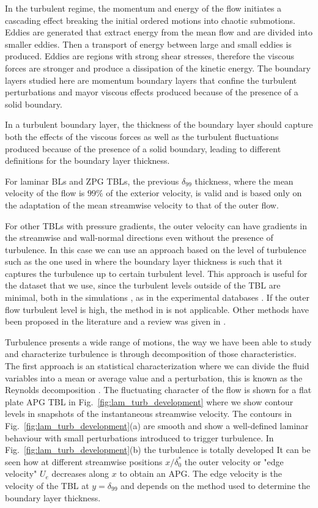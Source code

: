 In the turbulent regime, the momentum and energy of the flow initiates a cascading effect breaking the initial ordered motions into chaotic submotions. 
Eddies are generated that extract energy from the mean flow and are divided into smaller eddies. Then a transport of energy between large and small eddies is produced. Eddies are regions with strong shear stresses, therefore the viscous forces are stronger and produce a dissipation of the kinetic energy.
The boundary layers studied here are momentum boundary layers that confine the turbulent perturbations and mayor viscous effects produced because of the presence of a solid boundary.

In a turbulent boundary layer, the thickness of the boundary layer should capture both the effects of the viscous forces as well as the turbulent fluctuations produced because of the presence of a solid boundary, leading to different definitions for the boundary layer thickness.

For laminar BLs and ZPG TBLs, the previous $\delta_{99}$ thickness, where the mean velocity of the flow is $99\%$ of the exterior velocity, is valid and is based only on the adaptation of the mean streamwise velocity to that of the outer flow.

For other TBLs with pressure gradients, the outer velocity can have gradients in the streamwise and wall-normal directions even without the presence of turbulence. In this case we can use an approach based on the level of turbulence such as the one used in \cite{diagnostic_Vinuesa} where the boundary layer thickness is such that it captures the turbulence up to certain turbulent level.
This approach is useful for the dataset that we use, since the turbulent levels outside of the TBL are minimal, both in the simulations \citep{E-AmorZPG, bobke2017, Pozuelo_JFM_22}, as in the experimental databases \citep{Sanmiguel_PRF}.
If the outer flow turbulent level is high, the method in \cite{diagnostic_Vinuesa} is not applicable. 
Other methods have been proposed in the literature and a review was given in \cite{d99_determination_2020}.

Turbulence presents a wide range of motions, the way we have been able to study and characterize turbulence is through decomposition of those characteristics. 
The first approach is an statistical characterization where we can divide the fluid variables into a mean or average value and a perturbation, this is known as the Reynolds decomposition \citep{Rey_decomp}.
The fluctuating character of the flow is shown for a flat plate APG TBL in Fig.~\ref{fig:lam_turb_development} where we show contour levels in snapshots of the instantaneous streamwise velocity. The contours in Fig.~\ref{fig:lam_turb_development}(a) are smooth and show a well-defined laminar behaviour with small perturbations introduced to trigger turbulence. In Fig.~\ref{fig:lam_turb_development}(b) the turbulence is totally developed It can be seen how at different streamwise positions $x/\delta^*_0$ the outer velocity or "edge velocity" $U_e$ decreases along $x$ to obtain an APG. The edge velocity is the velocity of the TBL at $y=\delta_{99}$ and depends on the method used to determine the boundary layer thickness.


